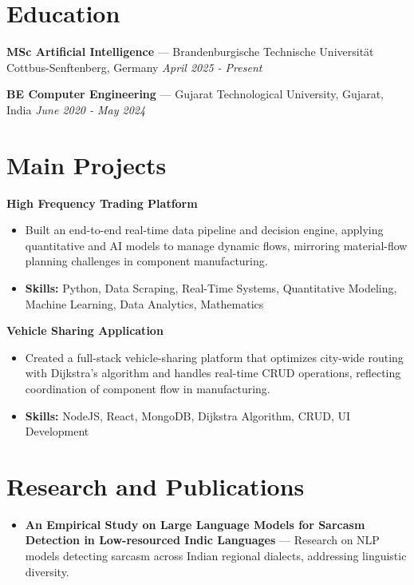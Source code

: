 \documentclass[a4paper,10pt]{article}
\begin{document}
\section*{Education}
\textbf{MSc Artificial Intelligence} — Brandenburgische Technische Universität Cottbus-Senftenberg, Germany \hfill \textit{April 2025 - Present}\par
\vspace{1.5pt}
\textbf{BE Computer Engineering} — Gujarat Technological University, Gujarat, India \hfill \textit{June 2020 - May 2024}\par

\section*{Main Projects}
\textbf{High Frequency Trading Platform}\par
\vspace{1pt}
\begin{itemize}
  \item Built an end-to-end real-time data pipeline and decision engine, applying quantitative and AI models to manage dynamic flows, mirroring material-flow planning challenges in component manufacturing.
  \item \textbf{Skills:} Python, Data Scraping, Real-Time Systems, Quantitative Modeling, Machine Learning, Data Analytics, Mathematics
\end{itemize}
\vspace{3pt}
\textbf{Vehicle Sharing Application}\par
\vspace{1pt}
\begin{itemize}
  \item Created a full-stack vehicle-sharing platform that optimizes city-wide routing with Dijkstra's algorithm and handles real-time CRUD operations, reflecting coordination of component flow in manufacturing.
  \item \textbf{Skills:} NodeJS, React, MongoDB, Dijkstra Algorithm, CRUD, UI Development
\end{itemize}

\section*{Research and Publications}
\begin{itemize}
\item \textbf{An Empirical Study on Large Language Models for Sarcasm Detection in Low-resourced Indic Languages} — Research on NLP models detecting sarcasm across Indian regional dialects, addressing linguistic diversity.
\end{itemize}
\end{document}
